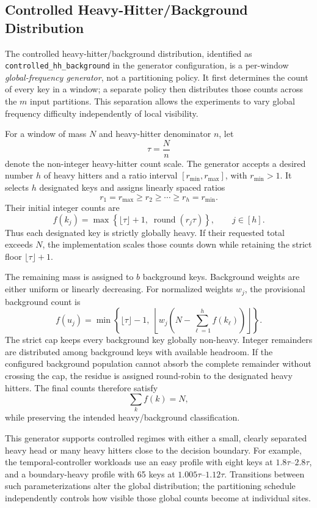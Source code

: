 \documentclass[sigconf, nonacm]{acmart}
\begin{document}
\subsection{Controlled Heavy-Hitter/Background Distribution}
\label{app:hh-background}

The controlled heavy-hitter/background distribution, identified as
\texttt{controlled\_hh\_background} in the generator configuration, is a per-window
\emph{global-frequency generator}, not a partitioning policy.
It first determines the count of every key in a window; a separate policy then
distributes those counts across the \(m\) input partitions. This separation
allows the experiments to vary global frequency difficulty independently of
local visibility.

For a window of mass \(N\) and heavy-hitter denominator \(n\), let
\[
\tau=\frac{N}{n}
\]
denote the non-integer heavy-hitter count scale. The generator accepts a
desired number \(h\) of heavy hitters and a ratio interval
\([r_{\min},r_{\max}]\), with \(r_{\min}>1\). It selects \(h\) designated
keys and assigns linearly spaced ratios
\[
r_1=r_{\max}\ge r_2\ge\cdots\ge r_h=r_{\min}.
\]
Their initial integer counts are
\[
f(k_j)
=
\max\!\left\{
\lfloor\tau\rfloor+1,\;
\operatorname{round}(r_j\tau)
\right\},
\qquad j\in[h].
\]
Thus each designated key is strictly globally heavy. If their requested total
exceeds \(N\), the implementation scales those counts down while retaining
the strict floor \(\lfloor\tau\rfloor+1\).

The remaining mass is assigned to \(b\) background keys. Background weights
are either uniform or linearly decreasing. For normalized weights \(w_j\),
the provisional background count is
\[
f(u_j)
=
\min\!\left\{
\lfloor\tau\rfloor-1,\;
\left\lfloor
w_j\!\left(N-\sum_{\ell=1}^{h}f(k_\ell)\right)
\right\rfloor
\right\}.
\]
The strict cap keeps every background key globally non-heavy. Integer
remainders are distributed among background keys with available headroom.
If the configured background population cannot absorb the complete remainder
without crossing the cap, the residue is assigned round-robin to the
designated heavy hitters. The final counts therefore satisfy
\[
\sum_k f(k)=N,
\]
while preserving the intended heavy/background classification.

This generator supports controlled regimes with either a small, clearly
separated heavy head or many heavy hitters close to the decision boundary.
For example, the temporal-controller workloads use an easy profile with eight
keys at \(1.8\tau\)--\(2.8\tau\), and a boundary-heavy profile with 65 keys at
\(1.005\tau\)--\(1.12\tau\). Transitions between such parameterizations alter
the global distribution; the partitioning schedule independently controls how
visible those global counts become at individual sites.
\end{document}
